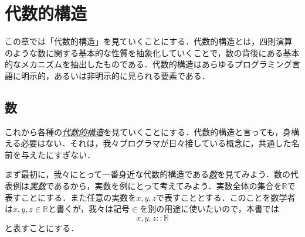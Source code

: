 \documentclass[a4paper,draft]{jsbook}
\newenvironment{leader}{\begingroup}{\endgroup}
\newcommand{\keyword}[1]{{\underline{\emph{#1}}}}
\newcommand{\mathSpecialSet}[1]{\mathbb{#1}} %
\newcommand{\mathIn}{\mathrel{::}}
\begin{document}
\chapter{代数的構造}

\begin{leader}
この章では「代数的構造」を見ていくことにする．代数的構造とは，四則演算のような数に関する基本的な性質を抽象化していくことで，数の背後にある基本的なメカニズムを抽出したものである．代数的構造はあらゆるプログラミング言語に明示的，あるいは非明示的に見られる要素である．
\end{leader}

\section{数}

これから各種の\keyword{代数的構造}を見ていくことにする．代数的構造と言っても，身構える必要はない．それは，我々プログラマが日々接している概念に，共通した名前を与えたにすぎない．

まず最初に，我々にとって一番身近な代数的構造である\keyword{数}を見てみよう．数の代表例は\keyword{実数}であるから，実数を例にとって考えてみよう．実数全体の集合を$\mathSpecialSet{R}$で表すことにする．また任意の実数を$x,y,z$で表すこととする．このことを数学者は$x,y,z\in\mathSpecialSet{R}$と書くが，我々は記号$\in$を別の用途に使いたいので，本書では
\begin{equation}
x,y,z\mathIn\mathSpecialSet{R}
\end{equation}
と表すことにする．
\end{document}
